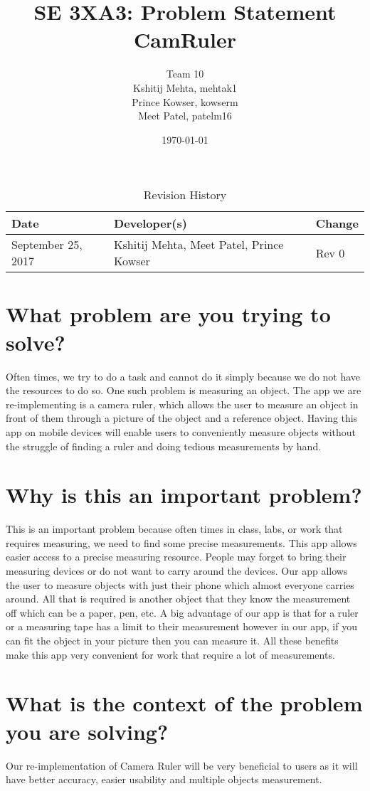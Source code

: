 \documentclass{article}
\title{SE 3XA3: Problem Statement\\CamRuler}
\author{Team 10
		\\ Kshitij Mehta, mehtak1
		\\ Prince Kowser, kowserm
		\\ Meet Patel, patelm16
}
\date{\today}
\begin{document}
\begin{table}[hp]
\caption{Revision History} \label{TblRevisionHistory}
\begin{tabularx}{\textwidth}{llX}
\toprule
\textbf{Date} & \textbf{Developer(s)} & \textbf{Change}\\
\midrule
September 25, 2017 & Kshitij Mehta, Meet Patel, Prince Kowser & Rev 0\\
\bottomrule
\end{tabularx}
\end{table}

\newpage

\maketitle

\section{What problem are you trying to solve? }
Often times, we try to do a task and cannot do it simply because we do not have the resources to do so. One such problem is measuring an object. The app we are re-implementing is a camera ruler, which allows the user to measure an object in front of them through a picture of the object and a reference object. Having this app on mobile devices will enable users to conveniently measure objects without the struggle of finding a ruler and doing tedious measurements by hand. 

\section{Why is this an important problem?}
This is an important problem because often times in class, labs, or work that requires measuring, we need to find some precise measurements. This app allows easier access to a precise measuring resource. People may forget to bring their measuring devices or do not want to carry around the devices. Our app allows the user to measure objects with just their phone which almost everyone carries around. All that is required is another object that they know the measurement off which can be a paper, pen, etc. A big advantage of our app is that for a ruler or a measuring tape has a limit to their measurement however in our app, if you can fit the object in your picture then you can measure it. All these benefits make this app very convenient for work that require a lot of measurements.

\section{What is the context of the problem you are solving?}
Our re-implementation of Camera Ruler will be very beneficial to users as it will have better accuracy, easier usability and multiple objects measurement.
\end{document}
